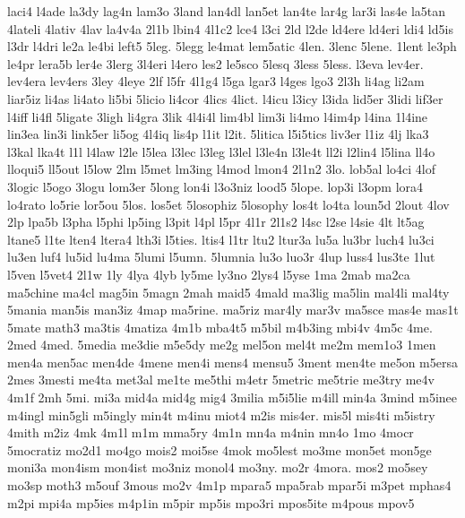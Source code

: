 {laci4 
l4ade 
la3dy 
lag4n 
lam3o 
3land 
lan4dl 
lan5et 
lan4te 
lar4g 
lar3i 
las4e 
la5tan 
4lateli 
4lativ 
4lav 
la4v4a 
2l1b 
lbin4 
4l1c2 
lce4 
l3ci 
2ld 
l2de 
ld4ere 
ld4eri 
ldi4 
ld5is 
l3dr 
l4dri 
le2a 
le4bi 
left5 
5leg. 
5legg 
le4mat 
lem5atic 
4len. 
3lenc 
5lene. 
1lent 
le3ph 
le4pr 
lera5b 
ler4e 
3lerg 
3l4eri 
l4ero 
les2 
le5sco 
5lesq 
3less 
5less. 
l3eva 
lev4er. 
lev4era 
lev4ers 
3ley 
4leye 
2lf 
l5fr 
4l1g4 
l5ga 
lgar3 
l4ges 
lgo3 
2l3h 
li4ag 
li2am 
liar5iz 
li4as 
li4ato 
li5bi 
5licio 
li4cor 
4lics 
4lict. 
l4icu 
l3icy 
l3ida 
lid5er 
3lidi 
lif3er 
l4iff 
li4fl 
5ligate 
3ligh 
li4gra 
3lik 
4l4i4l 
lim4bl 
lim3i 
li4mo 
l4im4p 
l4ina 
1l4ine 
lin3ea 
lin3i 
link5er 
li5og 
4l4iq 
lis4p 
l1it 
l2it. 
5litica 
l5i5tics 
liv3er 
l1iz 
4lj 
lka3 
l3kal 
lka4t 
l1l 
l4law 
l2le 
l5lea 
l3lec 
l3leg 
l3lel 
l3le4n 
l3le4t 
ll2i 
l2lin4 
l5lina 
ll4o 
lloqui5 
ll5out 
l5low 
2lm 
l5met 
lm3ing 
l4mod 
lmon4 
2l1n2 
3lo. 
lob5al 
lo4ci 
4lof 
3logic 
l5ogo 
3logu 
lom3er 
5long 
lon4i 
l3o3niz 
lood5 
5lope. 
lop3i 
l3opm 
lora4 
lo4rato 
lo5rie 
lor5ou 
5los. 
los5et 
5losophiz 
5losophy 
los4t 
lo4ta 
loun5d 
2lout 
4lov 
2lp 
lpa5b 
l3pha 
l5phi 
lp5ing 
l3pit 
l4pl 
l5pr 
4l1r 
2l1s2 
l4sc 
l2se 
l4sie 
4lt 
lt5ag 
ltane5 
l1te 
lten4 
ltera4 
lth3i 
l5ties. 
ltis4 
l1tr 
ltu2 
ltur3a 
lu5a 
lu3br 
luch4 
lu3ci 
lu3en 
luf4 
lu5id 
lu4ma 
5lumi 
l5umn. 
5lumnia 
lu3o 
luo3r 
4lup 
luss4 
lus3te 
1lut 
l5ven 
l5vet4 
2l1w 
1ly 
4lya 
4lyb 
ly5me 
ly3no 
2lys4 
l5yse 
1ma 
2mab 
ma2ca 
ma5chine 
ma4cl 
mag5in 
5magn 
2mah 
maid5 
4mald 
ma3lig 
ma5lin 
mal4li 
mal4ty 
5mania 
man5is 
man3iz 
4map 
ma5rine. 
ma5riz 
mar4ly 
mar3v 
ma5sce 
mas4e 
mas1t 
5mate 
math3 
ma3tis 
4matiza 
4m1b 
mba4t5 
m5bil 
m4b3ing 
mbi4v 
4m5c 
4me. 
2med 
4med. 
5media 
me3die 
m5e5dy 
me2g 
mel5on 
mel4t 
me2m 
mem1o3 
1men 
men4a 
men5ac 
men4de 
4mene 
men4i 
mens4 
mensu5 
3ment 
men4te 
me5on 
m5ersa 
2mes 
3mesti 
me4ta 
met3al 
me1te 
me5thi 
m4etr 
5metric 
me5trie 
me3try 
me4v 
4m1f 
2mh 
5mi. 
mi3a 
mid4a 
mid4g 
mig4 
3milia 
m5i5lie 
m4ill 
min4a 
3mind 
m5inee 
m4ingl 
min5gli 
m5ingly 
min4t 
m4inu 
miot4 
m2is 
mis4er. 
mis5l 
mis4ti 
m5istry 
4mith 
m2iz 
4mk 
4m1l 
m1m 
mma5ry 
4m1n 
mn4a 
m4nin 
mn4o 
1mo 
4mocr 
5mocratiz 
mo2d1 
mo4go 
mois2 
moi5se 
4mok 
mo5lest 
mo3me 
mon5et 
mon5ge 
moni3a 
mon4ism 
mon4ist 
mo3niz 
monol4 
mo3ny. 
mo2r 
4mora. 
mos2 
mo5sey 
mo3sp 
moth3 
m5ouf 
3mous 
mo2v 
4m1p 
mpara5 
mpa5rab 
mpar5i 
m3pet 
mphas4 
m2pi 
mpi4a 
mp5ies 
m4p1in 
m5pir 
mp5is 
mpo3ri 
mpos5ite 
m4pous 
mpov5 
}
